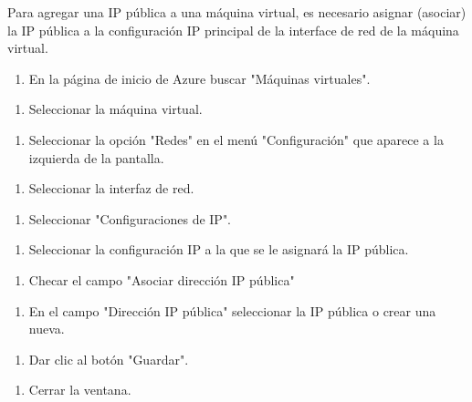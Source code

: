 Para agregar una IP pública a una máquina virtual, es necesario asignar (asociar) la IP pública a la configuración IP principal de la interface de red de la máquina virtual.

\begin{enumerate}
\item En la página de inicio de Azure buscar "Máquinas virtuales".
\end{enumerate}

\begin{enumerate}
\item Seleccionar la máquina virtual.
\end{enumerate}

\begin{enumerate}
\item Seleccionar la opción "Redes" en el menú "Configuración" que aparece a la izquierda de la pantalla.
\end{enumerate}

\begin{enumerate}
\item Seleccionar la interfaz de red.
\end{enumerate}

\begin{enumerate}
\item Seleccionar "Configuraciones de IP".
\end{enumerate}

\begin{enumerate}
\item Seleccionar la configuración IP a la que se le asignará la IP pública.
\end{enumerate}

\begin{enumerate}
\item Checar el campo "Asociar dirección IP pública"
\end{enumerate}

\begin{enumerate}
\item En el campo "Dirección IP pública" seleccionar la IP pública o crear una nueva.
\end{enumerate}

\begin{enumerate}
\item Dar clic al botón "Guardar".
\end{enumerate}

\begin{enumerate}
\item Cerrar la ventana.
\end{enumerate}

